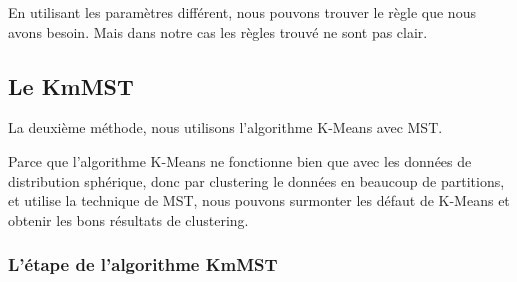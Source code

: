 En utilisant les paramètres différent, nous pouvons trouver le règle que nous avons besoin. Mais dans notre cas les règles trouvé ne sont pas clair.

\subsection{Le KmMST}
La deuxième méthode, nous utilisons l'algorithme K-Means avec MST.

Parce que l'algorithme K-Means ne fonctionne bien que avec les données de distribution sphérique, donc par clustering le données en beaucoup de partitions, et utilise la technique de MST, nous pouvons surmonter les défaut de K-Means et obtenir les bons résultats de clustering.
 
  \subsubsection{L'étape de l'algorithme KmMST}
  
